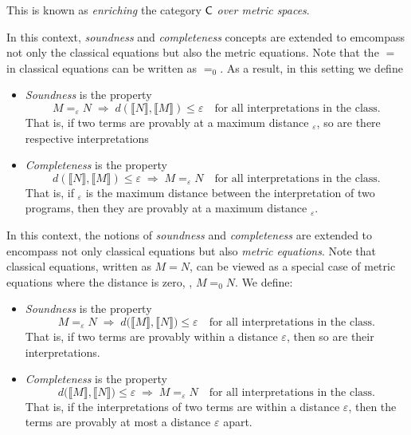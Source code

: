 This is known as \emph{enriching} the category $\mathsf{C}$ \emph{over metric spaces}. 

In this context, \emph{soundness} and \emph{completeness} concepts are extended to emcompass not only the classical equations but also the metric equations. Note that the $=$ in classical equations can be written as $=_0$. As a result, in this setting we define 

\begin{itemize}
  \item \emph{Soundness} is the property 
  \[
  M =_{\varepsilon} N \;\Rightarrow\;  d (\llbracket N \rrbracket, \llbracket M \rrbracket) \leq \varepsilon
  \quad \text{for all interpretations in the class.}
  \]
  That is, if two terms are provably at a maximum distance $_{\varepsilon}$, so are there respective interpretations
  \item \emph{Completeness} is the property 
  \[
  d (\llbracket N \rrbracket, \llbracket M \rrbracket) \leq \varepsilon
  \;\Rightarrow\;  M =_{\varepsilon} N 
  \quad \text{for all interpretations in the class.}
  \]
  That is, if $_{\varepsilon}$ is the maximum distance between the interpretation of two programs, then they are provably at a maximum distance $_{\varepsilon}$.
\end{itemize}



In this context, the notions of \emph{soundness} and \emph{completeness} are extended to encompass not only classical equations but also \emph{metric equations}. Note that classical equations, written as $M = N$, can be viewed as a special case of metric equations where the distance is zero, \ie, $M =_0 N$. We define:

\begin{itemize}
  \item \emph{Soundness} is the property 
  \[
  M =_{\varepsilon} N \;\Rightarrow\; d\big(\llbracket M \rrbracket, \llbracket N \rrbracket\big) \leq \varepsilon
  \quad \text{for all interpretations in the class.}
  \]
  That is, if two terms are provably within a distance $\varepsilon$, then so are their interpretations.

  \item \emph{Completeness} is the property 
  \[
  d\big(\llbracket M \rrbracket, \llbracket N \rrbracket\big) \leq \varepsilon \;\Rightarrow\; M =_{\varepsilon} N
  \quad \text{for all interpretations in the class.}
  \]
  That is, if the interpretations of two terms are within a distance $\varepsilon$, then the terms are provably at most a distance $\varepsilon$ apart.
\end{itemize}

